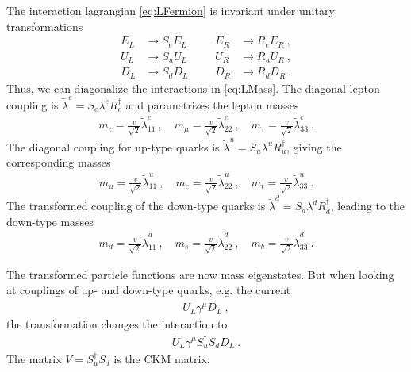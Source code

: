 The interaction lagrangian \eqref{eq:LFermion} is invariant under unitary transformations
\begin{align}
	E_L &\rightarrow S_eE_L && &E_R &\rightarrow R_eE_R \ , \\
	U_L &\rightarrow S_uU_L && &U_R &\rightarrow R_uU_R \ , \\
	D_L &\rightarrow S_dD_L && &D_R &\rightarrow R_dD_R \ .
\end{align}
Thus, we can diagonalize the interactions in \eqref{eq:LMass}. The diagonal lepton coupling is $\tilde{\lambda}^e = S_e\lambda^eR_e^\dagger$ and parametrizes the lepton masses
\begin{align}
	m_e = \frac{v}{\sqrt{2}}\tilde{\lambda}_{11}^e \ , \quad m_\mu = \frac{v}{\sqrt{2}}\tilde{\lambda}_{22}^e \ , \quad m_\tau = \frac{v}{\sqrt{2}}\tilde{\lambda}_{33}^e \ .
\end{align}
The diagonal coupling for up-type quarks is $\tilde{\lambda}^u = S_u\lambda^uR_u^\dagger$, giving the corresponding masses
\begin{align}
	m_u = \frac{v}{\sqrt{2}}\tilde{\lambda}_{11}^u \ , \quad m_c = \frac{v}{\sqrt{2}}\tilde{\lambda}_{22}^u \ , \quad m_t = \frac{v}{\sqrt{2}}\tilde{\lambda}_{33}^u \ .
\end{align}
The transformed coupling of the down-type quarks is $\tilde{\lambda}^d = S_d\lambda^dR_d^\dagger$, leading to the down-type masses
\begin{align}
	m_d = \frac{v}{\sqrt{2}}\tilde{\lambda}_{11}^d \ , \quad m_s = \frac{v}{\sqrt{2}}\tilde{\lambda}_{22}^d \ , \quad m_b = \frac{v}{\sqrt{2}}\tilde{\lambda}_{33}^d \ .
\end{align}


The transformed particle functions are now mass eigenstates. But when looking at couplings of up- and down-type quarks, e.g. the current
\begin{align}
	\bar{U}_L\gamma^\mu D_L \ ,
\end{align}
the transformation changes the interaction to
\begin{align}
	\bar{U}_L\gamma^\mu S_u^\dagger S_d D_L \ .
\end{align}
The matrix $V = S_u^\dagger S_d$ is the CKM matrix.